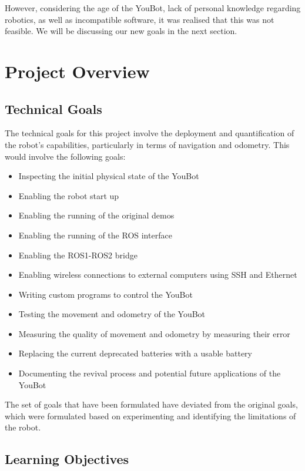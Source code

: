 \documentclass[a4paper, 12pt]{article}
\begin{document}
    However, considering the age of the YouBot, lack of personal knowledge regarding robotics, as well as incompatible software, it was realised that this was not feasible. We will be discussing our new goals in the next section. 

    \pagebreak
    
    \section{Project Overview}

    \subsection{Technical Goals}

    The technical goals for this project involve the deployment and quantification of the robot's capabilities, particularly in terms of navigation and odometry. This would involve the following goals: 
    \begin{itemize}
        \item Inspecting the initial physical state of the YouBot
        \item Enabling the robot start up
        \item Enabling the running of the original demos
        \item Enabling the running of the ROS interface
        \item Enabling the ROS1-ROS2 bridge
        \item Enabling wireless connections to external computers using SSH and Ethernet
        \item Writing custom programs to control the YouBot
        \item Testing the movement and odometry of the YouBot
        \item Measuring the quality of movement and odometry by measuring their error
        \item Replacing the current deprecated batteries with a usable battery
        \item Documenting the revival process and potential future applications of the YouBot
    \end{itemize}
    
    The set of goals that have been formulated have deviated from the original goals, which were formulated based on experimenting and identifying the limitations of the robot. 

    \subsection{Learning Objectives}
\end{document}
